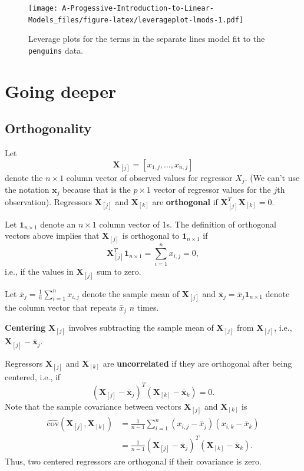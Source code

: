 \documentclass[
]{book}
\theoremstyle{definition}
\theoremstyle{definition}
\theoremstyle{definition}
\theoremstyle{definition}
\theoremstyle{remark}
\begin{document}
\begin{figure}
\centering
\texttt{[image: A-Progessive-Introduction-to-Linear-Models\_files/figure-latex/leverageplot-lmods-1.pdf]}
\caption{\label{fig:leverageplot-lmods}Leverage plots for the terms in the separate lines model fit to the \texttt{penguins} data.}
\end{figure}

\hypertarget{going-deeper-1}{%
\section{Going deeper}\label{going-deeper-1}}

\hypertarget{orthogonality}{%
\subsection{Orthogonality}\label{orthogonality}}

Let \[\mathbf{X}_{[j]}=[x_{1,j},\ldots,x_{n,j}]\] denote the \(n\times 1\)
column vector of observed values for regressor \(X_j\). (We can't use the
notation \(\mathbf{x}_j\) because that is the \(p\times 1\) vector of
regressor values for the \(j\)th observation). Regressors
\(\mathbf{X}_{[j]}\) and \(\mathbf{X}_{[k]}\) are \textbf{orthogonal} if
\(\mathbf{X}_{[j]}^T \mathbf{X}_{[k]}=0\).

Let \(\boldsymbol{1}_{n\times1}\) denote an \(n\times 1\) column vector of
1s. The definition of orthogonal vectors above implies that
\(\mathbf{X}_{[j]}\) is orthogonal to \(\boldsymbol{1}_{n\times1}\) if \[
\mathbf{X}_{[j]}^T \boldsymbol{1}_{n\times1} = \sum_{i=1}^n x_{i,j} = 0,\]
i.e., if the values in \(\mathbf{X}_{[j]}\) sum to zero.

Let \(\bar{x}_j = \frac{1}{n}\sum_{i=1}^n x_{i,j}\) denote the sample mean
of \(\mathbf{X}_{[j]}\) and
\(\bar{\mathbf{x}}_j = \bar{x}_j \boldsymbol{1}_{n\times 1}\) denote the
column vector that repeats \(\bar{x}_j\) \(n\) times.

\textbf{Centering} \(\mathbf{X}_{[j]}\) involves subtracting the sample mean of
\(\mathbf{X}_{[j]}\) from \(\mathbf{X}_{[j]}\), i.e.,
\(\mathbf{X}_{[j]} - \bar{\mathbf{x}}_j\).

Regressors \(\mathbf{X}_{[j]}\) and \(\mathbf{X}_{[k]}\) are
\textbf{uncorrelated} if they are orthogonal after being centered, i.e., if
\[
(\mathbf{X}_{[j]} - \bar{\mathbf{x}}_j)^T (\mathbf{X}_{[k]} - \bar{\mathbf{x}}_k)=0.
\] Note that the sample covariance between vectors \(\mathbf{X}_{[j]}\)
and \(\mathbf{X}_{[k]}\) is \[
\begin{aligned}
\widehat{\mathrm{cov}}(\mathbf{X}_{[j]}, \mathbf{X}_{[k]}) &= \frac{1}{n-1}\sum_{i=1}^n (x_{i,j} - \bar{x}_j)(x_{i,k} - \bar{x}_k) \\
 &= \frac{1}{n-1}(\mathbf{X}_{[j]} - \bar{\mathbf{x}}_j)^T (\mathbf{X}_{[k]} - \bar{\mathbf{x}}_k).
\end{aligned}
\]Thus, two centered regressors are orthogonal if their covariance is
zero.
\end{document}
